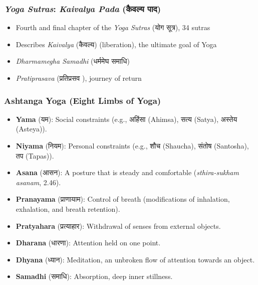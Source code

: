 \begin{frame}[fragile]\frametitle{\textit{Yoga Sutras}: \textit{Kaivalya Pada} (कैवल्य पाद)}

    \begin{itemize}
        \item Fourth and final chapter of the \textit{Yoga Sutras} (योग सूत्र), 34 sutras
        \item Describes \textit{Kaivalya} (कैवल्य) (liberation), the ultimate goal of Yoga
        \item \textit{Dharmamegha Samadhi} (धर्ममेघ समाधि)
        \item \textit{Pratiprasava} (प्रतिप्रसव ), journey of return
    \end{itemize}

\end{frame}



\begin{frame}[fragile]\frametitle{Ashtanga Yoga (Eight Limbs of Yoga)}
    \begin{itemize}
        \item \textbf{Yama} (यम): Social constraints (e.g., अहिंसा (Ahimsa), सत्य (Satya), अस्तेय (Asteya)).
        \item \textbf{Niyama} (नियम): Personal constraints (e.g., शौच (Shaucha), संतोष (Santosha), तप (Tapas)).
        \item \textbf{Asana} (आसन): A posture that is steady and comfortable (\textit{sthira-sukham asanam}, 2.46).
        \item \textbf{Pranayama} (प्राणायाम): Control of breath (modifications of inhalation, exhalation, and breath retention).
        \item \textbf{Pratyahara} (प्रत्याहार): Withdrawal of senses from external objects.
        \item \textbf{Dharana} (धारणा): Attention held on one point.
        \item \textbf{Dhyana} (ध्यान): Meditation, an unbroken flow of attention towards an object.
        \item \textbf{Samadhi} (समाधि): Absorption, deep inner stillness.
    \end{itemize}
\end{frame}

